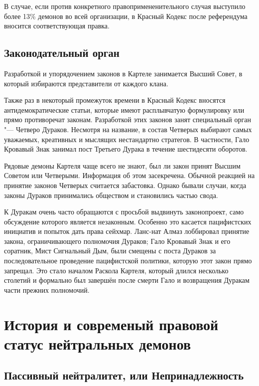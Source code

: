 В случае, если против конкретного правопримененительного случая выступило более 13\% демонов во всей организации, в Красный Кодекс после референдума вносится соответствующая правка.

\subsection{Законодательный орган}

Разработкой и упорядочением законов в Картеле занимается Высший Совет, в который избираются представители от каждого клана.

Также раз в некоторый промежуток времени в Красный Кодекс вносятся антидемократические статьи, которые имеют расплывчатую формулировку или прямо противоречат законам.
Разработкой этих законов занят специальный орган "--- Четверо Дураков.
Несмотря на название, в состав Четверых выбирают самых уважаемых, креативных и мыслящих нестандартно стратегов.
В частности, Гало Кровавый Знак занимал пост Третьего Дурака в течение шестидесяти оборотов.

Рядовые демоны Картеля чаще всего не знают, был ли закон принят Высшим Советом или Четверыми.
Информация об этом засекречена.
Обычной реакцией на принятие законов Четверых считается забастовка.
Однако бывали случаи, когда законы Дураков принимались обществом и становились частью свода.

К Дуракам очень часто обращаются с просьбой выдвинуть законопроект, само обсуждение которого является незаконным.
Особенно это касается пацифистских инициатив и попыток дать права сейхмар.
Ланс-нат Алмаз лоббировал принятие закона, ограничивающего полномочия Дураков;
Гало Кровавый Знак и его соратник, Мист Сигнальный Дым, были смещены с поста Дураков за последовательное проведение пацифистской политики, которую этот закон прямо запрещал.
Это стало началом Раскола Картеля, который длился несколько столетий и формально был завершён после смерти Гало и возвращения Дуракам части прежних полномочий.

\section{История и современый правовой статус нейтральных демонов}

\subsection{Пассивный нейтралитет, или Непринадлежность}

